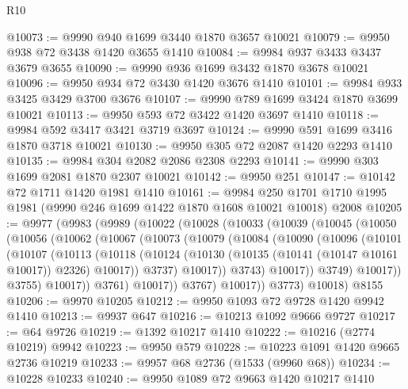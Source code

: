 \begin{lexlean}{R10}
\begin{coremodule}
@10073 := @9990 @940 @1699 @3440 @1870 @3657 @10021
@10079 := @9950 @938 @72 @3438 @1420 @3655 @1410
@10084 := @9984 @937 @3433 @3437 @3679 @3655
@10090 := @9990 @936 @1699 @3432 @1870 @3678 @10021
@10096 := @9950 @934 @72 @3430 @1420 @3676 @1410
@10101 := @9984 @933 @3425 @3429 @3700 @3676
@10107 := @9990 @789 @1699 @3424 @1870 @3699 @10021
@10113 := @9950 @593 @72 @3422 @1420 @3697 @1410
@10118 := @9984 @592 @3417 @3421 @3719 @3697
@10124 := @9990 @591 @1699 @3416 @1870 @3718 @10021
@10130 := @9950 @305 @72 @2087 @1420 @2293 @1410
@10135 := @9984 @304 @2082 @2086 @2308 @2293
@10141 := @9990 @303 @1699 @2081 @1870 @2307 @10021
@10142 := @9950 @251
@10147 := @10142 @72 @1711 @1420 @1981 @1410
@10161 := @9984
    @250
    @1701
    @1710
    @1995
    @1981
    (@9990 @246 @1699 @1422 @1870 @1608 @10021 @10018)
    @2008
@10205 := @9977
    (@9983
      (@9989
        (@10022
          (@10028
            (@10033
              (@10039
                (@10045
                  (@10050
                    (@10056
                      (@10062
                        (@10067
                          (@10073
                            (@10079
                              (@10084
                                (@10090
                                  (@10096
                                    (@10101
                                      (@10107
                                        (@10113
                                          (@10118
                                            (@10124
                                              (@10130
                                                (@10135 (@10141 (@10147 @10161 @10017)) @2326)
                                                @10017))
                                            @3737)
                                          @10017))
                                      @3743)
                                    @10017))
                                @3749)
                              @10017))
                          @3755)
                        @10017))
                    @3761)
                  @10017))
              @3767)
            @10017))
        @3773)
      @10018)
    @8155
@10206 := @9970 @10205
@10212 := @9950 @1093 @72 @9728 @1420 @9942 @1410
@10213 := @9937 @647
@10216 := @10213 @1092 @9666 @9727
@10217 := @64 @9726
@10219 := @1392 @10217 @1410
@10222 := @10216 (@2774 @10219) @9942
@10223 := @9950 @579
@10228 := @10223 @1091 @1420 @9665 @2736 @10219
@10233 := @9957 @68 @2736 (@1533 (@9960 @68))
@10234 := @10228 @10233
@10240 := @9950 @1089 @72 @9663 @1420 @10217 @1410

\end{coremodule}
\end{lexlean}
